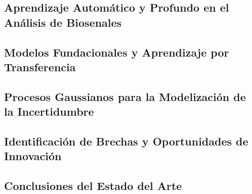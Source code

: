 \subsection{Aprendizaje Automático y Profundo en el Análisis de Biosenales}

\subsection{Modelos Fundacionales y Aprendizaje por Transferencia}

\subsection{Procesos Gaussianos para la Modelización de la Incertidumbre}

\subsection{Identificación de Brechas y Oportunidades de Innovación}

\subsection{Conclusiones del Estado del Arte}
